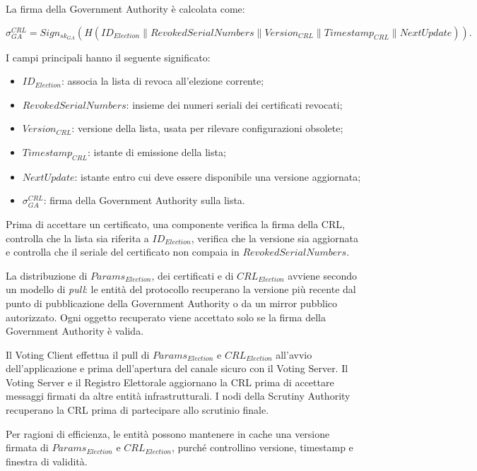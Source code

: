 \documentclass[a4paper,12pt]{article}
\begin{document}
La firma della Government Authority \`e calcolata come:

\[
	\sigma_{GA}^{CRL} =
	Sign_{sk_{GA}}(H(ID_{Election} \parallel RevokedSerialNumbers \parallel Version_{CRL} \parallel Timestamp_{CRL} \parallel NextUpdate)).
\]

I campi principali hanno il seguente significato:

\begin{itemize}
	\item \(ID_{Election}\): associa la lista di revoca all'elezione corrente;
	\item \(RevokedSerialNumbers\): insieme dei numeri seriali dei certificati revocati;
	\item \(Version_{CRL}\): versione della lista, usata per rilevare configurazioni obsolete;
	\item \(Timestamp_{CRL}\): istante di emissione della lista;
	\item \(NextUpdate\): istante entro cui deve essere disponibile una versione aggiornata;
	\item \(\sigma_{GA}^{CRL}\): firma della Government Authority sulla lista.
\end{itemize}

Prima di accettare un certificato, una componente verifica la firma della CRL, controlla che la lista sia riferita a \(ID_{Election}\), verifica che la versione sia aggiornata e controlla che il seriale del certificato non compaia in \(RevokedSerialNumbers\).

La distribuzione di \(Params_{Election}\), dei certificati e di \(CRL_{Election}\) avviene secondo un modello di \emph{pull}: le entit\`a del protocollo recuperano la versione pi\`u recente dal punto di pubblicazione della Government Authority o da un mirror pubblico autorizzato. 
Ogni oggetto recuperato viene accettato solo se la firma della Government Authority \`e valida.

Il Voting Client effettua il pull di \(Params_{Election}\) e \(CRL_{Election}\) all'avvio dell'applicazione e prima dell'apertura del canale sicuro con il Voting Server. 
Il Voting Server e il Registro Elettorale aggiornano la CRL prima di accettare messaggi firmati da altre entit\`a infrastrutturali. 
I nodi della Scrutiny Authority recuperano la CRL prima di partecipare allo scrutinio finale.

Per ragioni di efficienza, le entit\`a possono mantenere in cache una versione firmata di \(Params_{Election}\) e \(CRL_{Election}\), purch\'e controllino versione, timestamp e finestra di validit\`a. 
\end{document}
